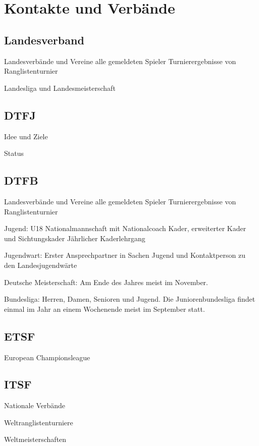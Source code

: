 \section{Kontakte und Verbände}

\subsection{Landesverband}

Landesverbände und Vereine
alle gemeldeten Spieler
Turnierergebnisse von Ranglistenturnier 

Landesliga und Landesmeisterschaft

\subsection{DTFJ}

Idee und Ziele

Status

\subsection{DTFB}

Landesverbände und Vereine
alle gemeldeten Spieler
Turnierergebnisse von Ranglistenturnier 

Jugend:
U18 Nationalmannschaft mit Nationalcoach
Kader, erweiterter Kader und Sichtungskader
Jährlicher Kaderlehrgang

Jugendwart: Erster Ansprechpartner in Sachen Jugend 
und Kontaktperson zu den Landesjugendwärte

Deutsche Meisterschaft: Am Ende des Jahres meist im November.

Bundesliga: Herren, Damen, Senioren und Jugend. Die Juniorenbundesliga findet einmal im Jahr an einem Wochenende meist im September statt. 

\subsection{ETSF}

European Championsleague

\subsection{ITSF}

Nationale Verbände

Weltranglistenturniere

Weltmeisterschaften



